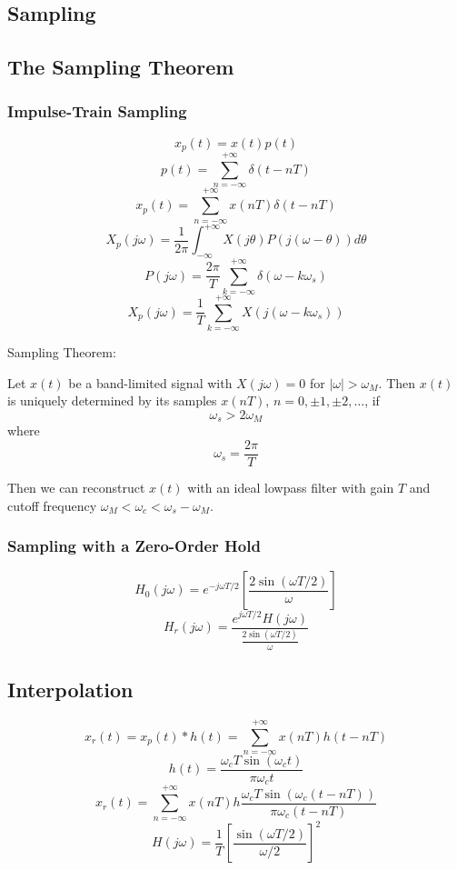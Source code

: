 \documentclass[landscape,a4paper]{article}
\begin{document}
\begin{multicols}{3}
\footnotesize

\section{Sampling}

\subsection{The Sampling Theorem}

\subsubsection{Impulse-Train Sampling}
$$x_p(t)=x(t)p(t)$$
$$p(t)=\sum_{n=-\infty}^{+\infty}\delta(t-nT)$$
$$x_p(t)=\sum_{n=-\infty}^{+\infty}x(nT)\delta(t-nT)$$
$$X_p(j\omega)=\frac{1}{2\pi}\int_{-\infty}^{+\infty}X(j\theta)P(j(\omega-\theta))d\theta$$
$$P(j\omega)=\frac{2\pi}{T}\sum_{k=-\infty}^{+\infty}\delta(\omega-k\omega_s)$$
$$X_p(j\omega)=\frac{1}{T}\sum_{k=-\infty}^{+\infty}X(j(\omega-k\omega_s))$$

Sampling Theorem:

Let $x(t)$ be a band-limited signal with $X(j\omega)=0$ for $|\omega|>\omega_M$. Then $x(t)$ is uniquely determined by its samples $x(nT)$, $n=0,\pm1,\pm2,\dots$, if $$\omega_s>2\omega_M$$ where $$\omega_s=\frac{2\pi}{T}$$

Then we can reconstruct $x(t)$ with an ideal lowpass filter with gain $T$ and cutoff frequency $\omega_M<\omega_c<\omega_s-\omega_M$.

\subsubsection{Sampling with a Zero-Order Hold}
$$H_0(j\omega)=e^{-j\omega T/2}\left[\frac{2\sin(\omega T/2)}{\omega}\right]$$
$$H_r(j\omega)=\frac{e^{j\omega T/2}H(j\omega)}{\frac{2\sin(\omega T/2)}{\omega}}$$

\subsection{Interpolation}
$$x_r(t)=x_p(t)*h(t)=\sum_{n=-\infty}^{+\infty}x(nT)h(t-nT)$$
$$h(t)=\frac{\omega_cT\sin(\omega_c t)}{\pi\omega_ct}$$
$$x_r(t)=\sum_{n=-\infty}^{+\infty}x(nT)h\frac{\omega_cT\sin(\omega_c(t-nT))}{\pi\omega_c(t-nT)}$$
$$H(j\omega)=\frac{1}{T}\left[\frac{\sin(\omega T/2)}{\omega/2}\right]^2$$


\end{multicols}
\end{document}
